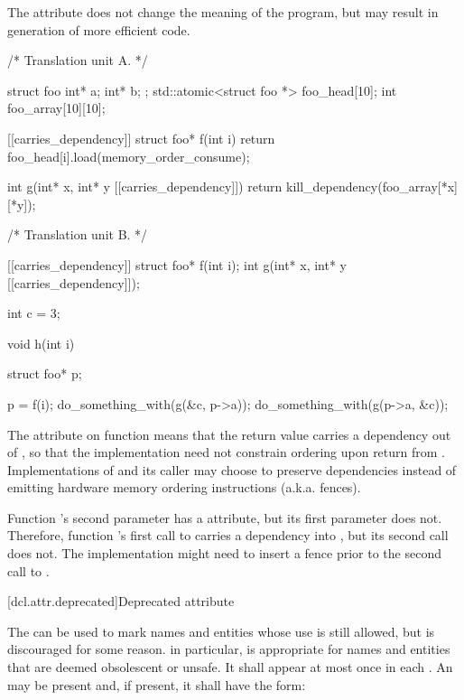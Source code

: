 \pnum
\enternote The  attribute does not change the meaning of the
program, but may result in generation of more efficient code. \exitnote

\pnum
\enterexample
\begin{codeblock}
/* Translation unit A. */

struct foo { int* a; int* b; };
std::atomic<struct foo *> foo_head[10];
int foo_array[10][10];

[[carries_dependency]] struct foo* f(int i) {
  return foo_head[i].load(memory_order_consume);
}

int g(int* x, int* y [[carries_dependency]]) {
  return kill_dependency(foo_array[*x][*y]);
}

/* Translation unit B. */

[[carries_dependency]] struct foo* f(int i);
int g(int* x, int* y [[carries_dependency]]);

int c = 3;

void h(int i) {
  struct foo* p;

  p = f(i);
  do_something_with(g(&c, p->a));
  do_something_with(g(p->a, &c));
}
\end{codeblock}

\pnum
The  attribute on function  means that the
return value carries a dependency out of , so that the implementation
need not constrain ordering upon return from . Implementations of
 and its caller may choose to preserve dependencies instead of emitting
hardware memory ordering instructions (a.k.a. fences).

\pnum
Function 's second parameter has a  attribute,
but its first parameter does not. Therefore, function 's first call to
 carries a dependency into , but its second call does not. The
implementation might need to insert a fence prior to the second call to
.

\exitexample%
%

[dcl.attr.deprecated]{Deprecated attribute}%

\pnum
The   can be used to mark names and entities
whose use is still allowed, but is discouraged for some reason. \enternote in particular,
 is appropriate for names and entities that are deemed obsolescent or
unsafe. \exitnote It shall appear at most once in each . An
 may be present and, if present, it shall have the form:

